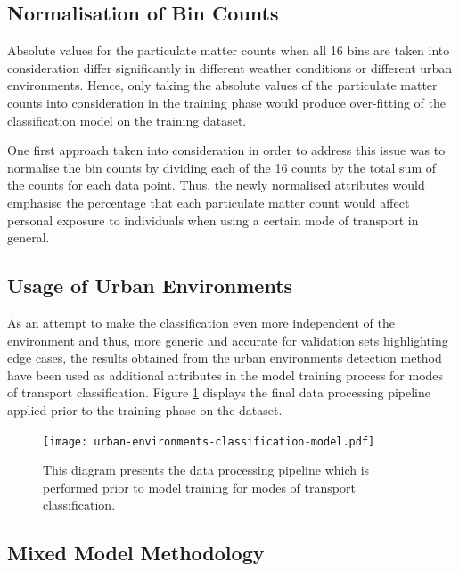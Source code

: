 \documentclass[bsc,frontabs,twoside,singlespacing,parskip,deptreport]{infthesis}     %
\begin{document}
\subsection{Normalisation of Bin Counts}
\label{subsec:bin-count-normalisation}

Absolute values for the particulate matter counts when all 16 bins are taken into consideration differ significantly in different weather conditions or different urban environments. Hence, only taking the absolute values of the particulate matter counts into consideration in the training phase would produce over-fitting of the classification model on the training dataset.

One first approach taken into consideration in order to address this issue was to normalise the bin counts by dividing each of the 16 counts by the total sum of the counts for each data point. Thus, the newly normalised attributes would emphasise the percentage that each particulate matter count would affect personal exposure to individuals when using a certain mode of transport in general.

\subsection{Usage of Urban Environments}

As an attempt to make the classification even more independent of the environment and thus, more generic and accurate for validation sets highlighting edge cases, the results obtained from the urban environments detection method have been used as additional attributes in the model training process for modes of transport classification. Figure \ref{fig:urban-environments-classification-model} displays the final data processing pipeline applied prior to the training phase on the dataset.

\begin{figure}[h]
  \center
  \texttt{[image: urban-environments-classification-model.pdf]}
  \caption{This diagram presents the data processing pipeline which is performed prior to model training for modes of transport classification.}
  \label{fig:urban-environments-classification-model}
\end{figure}

\subsection{Mixed Model Methodology}
\label{subsec:mixed-model-methodology}
\end{document}

